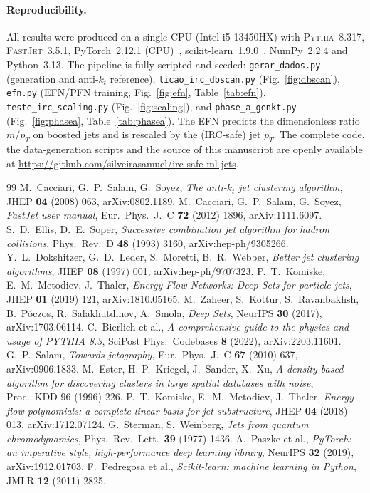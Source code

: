 \documentclass[11pt]{article}
\newcommand{\kt}{k_{t}}
\newcommand{\antikt}{anti-$\kt$}
\newcommand{\pt}{p_{T}}
\begin{document}
\paragraph{Reproducibility.}
All results were produced on a single CPU (Intel i5-13450HX) with \textsc{Pythia}~8.317,
\textsc{FastJet}~3.5.1, PyTorch~2.12.1 (CPU)~\cite{pytorch}, scikit-learn~1.9.0~\cite{sklearn},
NumPy~2.2.4 and Python~3.13. The pipeline is fully scripted and seeded:
\texttt{gerar\_dados.py} (generation and \antikt{} reference), \texttt{licao\_irc\_dbscan.py}
(Fig.~\ref{fig:dbscan}), \texttt{efn.py} (EFN/PFN training, Fig.~\ref{fig:efn},
Table~\ref{tab:efn}), \texttt{teste\_irc\_scaling.py} (Fig.~\ref{fig:scaling}), and
\texttt{phase\_a\_genkt.py} (Fig.~\ref{fig:phasea}, Table~\ref{tab:phasea}). The EFN predicts
the dimensionless ratio $m/\pt$ on boosted jets and is rescaled by the (IRC-safe) jet $\pt$.
The complete code, the data-generation scripts and the source of this manuscript are openly
available at \url{https://github.com/silveirasamuel/irc-safe-ml-jets}.

\begin{thebibliography}{99}
 M.~Cacciari, G.~P.~Salam, G.~Soyez,
  \emph{The anti-$k_t$ jet clustering algorithm}, JHEP \textbf{04} (2008) 063,
  arXiv:0802.1189.
 M.~Cacciari, G.~P.~Salam, G.~Soyez,
  \emph{FastJet user manual}, Eur.\ Phys.\ J.\ C \textbf{72} (2012) 1896, arXiv:1111.6097.
 S.~D.~Ellis, D.~E.~Soper,
  \emph{Successive combination jet algorithm for hadron collisions},
  Phys.\ Rev.\ D \textbf{48} (1993) 3160, arXiv:hep-ph/9305266.
 Y.~L.~Dokshitzer, G.~D.~Leder, S.~Moretti, B.~R.~Webber,
  \emph{Better jet clustering algorithms}, JHEP \textbf{08} (1997) 001, arXiv:hep-ph/9707323.
 P.~T.~Komiske, E.~M.~Metodiev, J.~Thaler,
  \emph{Energy Flow Networks: Deep Sets for particle jets}, JHEP \textbf{01} (2019) 121,
  arXiv:1810.05165.
 M.~Zaheer, S.~Kottur, S.~Ravanbakhsh, B.~P\'oczos, R.~Salakhutdinov,
  A.~Smola, \emph{Deep Sets}, NeurIPS \textbf{30} (2017), arXiv:1703.06114.
 C.~Bierlich et al.,
  \emph{A comprehensive guide to the physics and usage of PYTHIA 8.3},
  SciPost Phys.\ Codebases \textbf{8} (2022), arXiv:2203.11601.
 G.~P.~Salam, \emph{Towards jetography},
  Eur.\ Phys.\ J.\ C \textbf{67} (2010) 637, arXiv:0906.1833.
 M.~Ester, H.-P.~Kriegel, J.~Sander, X.~Xu,
  \emph{A density-based algorithm for discovering clusters in large spatial databases with
  noise}, Proc.\ KDD-96 (1996) 226.
 P.~T.~Komiske, E.~M.~Metodiev, J.~Thaler,
  \emph{Energy flow polynomials: a complete linear basis for jet substructure},
  JHEP \textbf{04} (2018) 013, arXiv:1712.07124.
 G.~Sterman, S.~Weinberg, \emph{Jets from quantum chromodynamics},
  Phys.\ Rev.\ Lett.\ \textbf{39} (1977) 1436.
 A.~Paszke et al.,
  \emph{PyTorch: an imperative style, high-performance deep learning library},
  NeurIPS \textbf{32} (2019), arXiv:1912.01703.
 F.~Pedregosa et al.,
  \emph{Scikit-learn: machine learning in Python}, JMLR \textbf{12} (2011) 2825.
\end{thebibliography}
\end{document}
